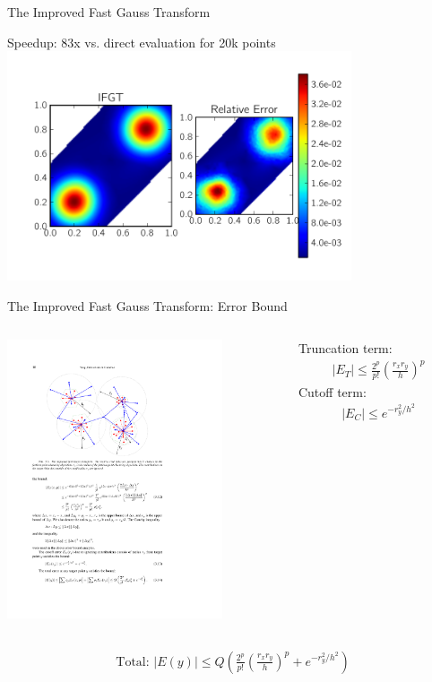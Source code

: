\documentclass[xcolor=pdftex,dvipsnames,table]{beamer}
\newcommand{\eq}[1]{\begin{align*} #1 \end{align*}}
\newcommand{\abs}[1]{\lvert #1 \rvert}
\begin{document}
\begin{frame}{The Improved Fast Gauss Transform}
  \begin{center}
    Speedup: 83x vs. direct evaluation for 20k points\\
    \includegraphics[width=4in]{2D.pdf}\end{center}
\end{frame}
\begin{frame}{The Improved Fast Gauss Transform: Error Bound}
\begin{columns}[onlytextwidth]
  \begin{column}{0.4\textwidth}
  \begin{center}\includegraphics[width=2.5in]{trunc.pdf}\end{center}
  \end{column}
  \begin{column}{0.4\textwidth}
    Truncation term: \eq{\abs{E_T}\leq \frac{2^p}{p!}\left(\frac{r_xr_y}{h}\right)^p}
	Cutoff term: \eq{\abs{E_C}\leq e^{-r_y^2/h^2}}
  \end{column}
\end{columns}
    \eq{\text{Total: }\abs{E(y)}\leq Q\left(\frac{2^p}{p!}\left(\frac{r_xr_y}{h}\right)^p + e^{-r_y^2/h^2}\right)}
\end{frame}
\end{document}
